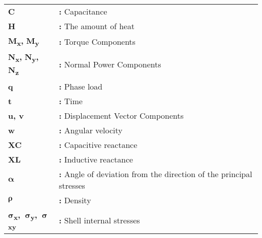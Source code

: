 \begin{tabular}{@{}p{2cm}l}
{\bf{C}} & {\bf:} Capacitance\\
{\bf H} & {\bf:} The amount of heat\\
{\bf M\textsubscript{x},} {\bf M\textsubscript{y}} & {\bf:} Torque Components\\
{\bf N\textsubscript{x},} {\bf N\textsubscript{y},} {\bf N\textsubscript{z}} & {\bf:} Normal Power Components\\
{\bf q} & {\bf:} Phase load\\
{\bf t} & {\bf:} Time\\
{\bf u, v} & {\bf:} Displacement Vector Components\\
{\bf w} & {\bf:} Angular velocity\\
{\bf XC} & {\bf:} Capacitive reactance\\
{\bf XL} & {\bf:}  Inductive reactance\\
{$\boldsymbol\alpha$} & {\bf:} Angle of deviation from the direction of the principal stresses\\
{$\boldsymbol\rho$} & {\bf:} Density\\
$\boldsymbol\sigma$\bf\textsubscript{x},~$\boldsymbol\sigma$\bf\textsubscript{y},~$\boldsymbol\sigma$\bf\textsubscript{xy} & {\bf:} Shell internal stresses\\
\end{tabular}
